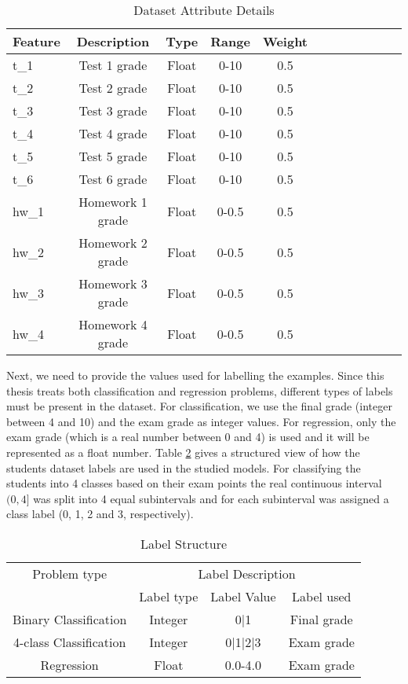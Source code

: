\begin{table}[ht]
\centering
\begin{tabular}{l*{10}{c}r}
\toprule
Feature            & Description & Type & Range & Weight \\
\hline
t\_1               & Test 1 grade & Float & 0-10 & 0.5 \\
t\_2               & Test 2 grade & Float & 0-10 & 0.5 \\
t\_3               & Test 3 grade & Float & 0-10 & 0.5 \\
t\_4               & Test 4 grade & Float & 0-10 & 0.5 \\
t\_5               & Test 5 grade & Float & 0-10 & 0.5 \\
t\_6               & Test 6 grade & Float & 0-10 & 0.5 \\
hw\_1              & Homework 1 grade & Float & 0-0.5 & 0.5 \\
hw\_2              & Homework 2 grade & Float & 0-0.5 & 0.5 \\
hw\_3              & Homework 3 grade & Float & 0-0.5 & 0.5 \\
hw\_4              & Homework 4 grade & Float & 0-0.5 & 0.5 \\
\bottomrule
\end{tabular}
\caption[Dataset Details]{Dataset Attribute Details}
\label{table_1}
\end{table}

Next, we need to provide the values used for labelling the examples. Since this 
thesis treats both classification and regression problems, different types of 
labels must be present in the dataset. For classification, we use the final 
grade (integer between 4 and 10) and the exam grade as integer values. For 
regression, only the exam grade (which is a real number between 0 and 4) is 
used and it will be represented as a float number. Table \ref{table_2} gives a 
structured view of how the students dataset labels are used in the studied models.
For classifying the students into 4 classes based on their exam points the 
real continuous interval $(0, 4]$ was split into 4 equal subintervals and for 
each subinterval was assigned a class label (0, 1, 2 and 3, respectively). 

\begin{table}[ht]
\centering
\begin{tabular}{cccc}
\toprule
\multicolumn{1}{c}{Problem type} & \multicolumn{3}{c}{Label Description} \\
\cmidrule(r){2-4}
                        & Label type  & Label Value & Label used \\
\midrule
Binary Classification   & Integer     & 0|1         & Final grade \\
4-class Classification  & Integer     & 0|1|2|3     & Exam grade \\
Regression              & Float       & 0.0-4.0     & Exam grade \\
\bottomrule
\end{tabular}
\caption[Label Structure]{Label Structure}
\label{table_2}
\end{table}

